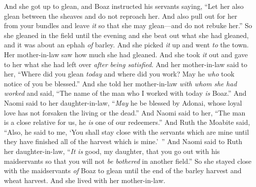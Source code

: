 \begin{biblechapter}
\verse And she got up to glean, and Boaz instructed his servants saying, “Let her also glean between the sheaves and do not reproach her.
\verse And also pull out for her from your bundles and leave \textit{it} so that she may glean—and do not rebuke her.”
\verse So she gleaned in the field until the evening and she beat out what she had gleaned, and it was about an ephah \textit{of} barley.
\verse And she picked \textit{it} up and went \textit{to} the town. Her mother-in-law saw how much she had gleaned. And she took \textit{it} out and gave to her what she had left over \textit{after being satisfied}.
\verse And her mother-in-law said to her, “Where did you glean \textit{today} and where did you work? May he \textit{who} took notice of you be blessed.” And she told her mother-in-law \textit{with whom she had worked} and said, “The name of the man who I worked with today \textit{is} Boaz.”
\verse And Naomi said to her daughter-in-law, “\textit{May} he be blessed by Adonai, whose loyal love has not forsaken the living or the dead.” And Naomi said to her, “The man is a close relative for us, he \textit{is} one of our redeemers.”
\verse And Ruth the Moabite said, “Also, he said to me, ‘You shall stay close with the servants which are mine until they have finished all of the harvest which is mine.’ ”
\verse And Naomi said to Ruth her daughter-in-law, “\textit{It is} good, my daughter, that you go out with his maidservants so that you will not \textit{be bothered} in another field.”
\verse So she stayed close with the maidservants \textit{of} Boaz to glean until the end of the barley harvest and wheat harvest. And she lived with her mother-in-law.
\end{biblechapter}

